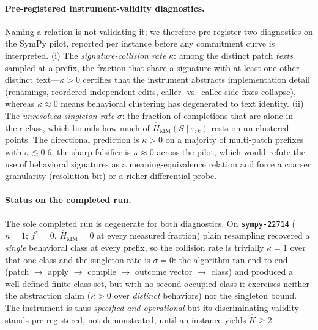 \documentclass[11pt]{article}
\newcommand{\strat}{S}
\newcommand{\prefix}{\tau_{:k}}
\begin{document}
\paragraph{Pre-registered instrument-validity diagnostics.}
Naming a relation is not validating it; we therefore pre-register two diagnostics on
the SymPy pilot, reported per instance before any commitment curve is interpreted.
(i) The \emph{signature-collision rate} $\kappa$: among the distinct patch \emph{texts}
sampled at a prefix, the fraction that share a signature with at least one other
distinct text---$\kappa>0$ certifies that the instrument abstracts implementation
detail (renamings, reordered independent edits, caller- vs.\ callee-side fixes
collapse), whereas $\kappa\approx0$ means behavioral clustering has degenerated to
text identity. (ii) The \emph{unresolved-singleton rate} $\sigma$: the fraction of
completions that are alone in their class, which bounds how much of
$\widehat H_{\mathrm{MM}}(\strat\mid\prefix)$ rests on un-clustered points. The
directional prediction is $\kappa>0$ on a majority of multi-patch prefixes with
$\sigma\lesssim0.6$; the sharp falsifier is $\kappa\approx0$ across the pilot, which
would refute the use of behavioral signatures as a meaning-equivalence relation and
force a coarser granularity (resolution-bit) or a richer differential probe.

\paragraph{Status on the completed run.}
The sole completed run is degenerate for both diagnostics. On \texttt{sympy-22714}
($n\!=\!1$; $f^\ast=0$, $\widehat{H}_{\mathrm{MM}}=0$ at every measured fraction)
plain resampling recovered a \emph{single} behavioral class at every prefix, so the
collision rate is trivially $\kappa=1$ over that one class and the singleton rate is
$\sigma=0$: the algorithm ran end-to-end (patch $\to$ apply $\to$ compile $\to$
outcome vector $\to$ class) and produced a well-defined finite class set, but with no
second occupied class it exercises neither the abstraction claim ($\kappa>0$ over
\emph{distinct} behaviors) nor the singleton bound. The instrument is thus
\emph{specified and operational} but its discriminating validity stands
pre-registered, not demonstrated, until an instance yields $\hat K\ge2$.
\end{document}
